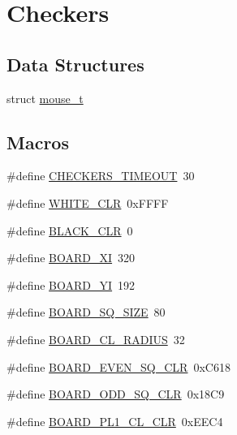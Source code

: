 \hypertarget{group___checkers}{}\section{Checkers}
\label{group___checkers}
\subsection*{Data Structures}
\begin{DoxyCompactItemize}
\item 
struct \hyperlink{structmouse__t}{mouse\+\_\+t}
\end{DoxyCompactItemize}
\subsection*{Macros}
\begin{DoxyCompactItemize}
\item 
\#define \hyperlink{group___checkers_ga2f705e070c4925daee2fda4016de437f}{C\+H\+E\+C\+K\+E\+R\+S\+\_\+\+T\+I\+M\+E\+O\+UT}~30
\item 
\#define \hyperlink{group___checkers_ga455c619153ef283f338157e6b2156179}{W\+H\+I\+T\+E\+\_\+\+C\+LR}~0x\+F\+F\+FF
\item 
\#define \hyperlink{group___checkers_ga84d1df2a2deef34e0e9f8d4375b5b8f6}{B\+L\+A\+C\+K\+\_\+\+C\+LR}~0
\item 
\#define \hyperlink{group___checkers_gaaf27b1edff1c7d7a5bf0a59ecb27cb5d}{B\+O\+A\+R\+D\+\_\+\+XI}~320
\item 
\#define \hyperlink{group___checkers_gaea13da4098bc5828bb6b3f6febcfd904}{B\+O\+A\+R\+D\+\_\+\+YI}~192
\item 
\#define \hyperlink{group___checkers_gae49255d26a5f626f705a0ab09f3f2fb8}{B\+O\+A\+R\+D\+\_\+\+S\+Q\+\_\+\+S\+I\+ZE}~80
\item 
\#define \hyperlink{group___checkers_ga0db4eef7cbfb2b192b09094169ce388f}{B\+O\+A\+R\+D\+\_\+\+C\+L\+\_\+\+R\+A\+D\+I\+US}~32
\item 
\#define \hyperlink{group___checkers_ga63f26b52fc35e2f57f2212dd1478d076}{B\+O\+A\+R\+D\+\_\+\+E\+V\+E\+N\+\_\+\+S\+Q\+\_\+\+C\+LR}~0x\+C618
\item 
\#define \hyperlink{group___checkers_ga07198a5ebf1a6ac88de94970f135a8ba}{B\+O\+A\+R\+D\+\_\+\+O\+D\+D\+\_\+\+S\+Q\+\_\+\+C\+LR}~0x18\+C9
\item 
\#define \hyperlink{group___checkers_ga0d38fb3c6c1987840ddb97f7696d997d}{B\+O\+A\+R\+D\+\_\+\+P\+L1\+\_\+\+C\+L\+\_\+\+C\+LR}~0x\+E\+E\+C4

\end{DoxyCompactItemize}
